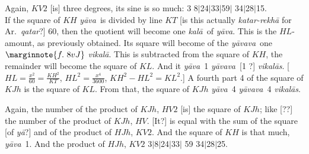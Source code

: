 \documentclass[11pt,a5paper]{book}
\def\kala{\textit{ka\-l\=a}}
\def\ya{\textit{y\=a}}
\def\yava{\textit{y\=ava}}
\def\yavava{\textit{y\=avava}}
\def\vikala{\textit{vi\-ka\-l\=a}}
\def\vikalas{\textit{vi\-ka\-l\=as}}
\def\danda{$|$}
\begin{document}
{Again, $KV2$ [is] three degrees, its sine is so much: 3 8\danda 24\danda 33\danda 59\danda
34\danda 28\danda 15. \\ 

\iffalse 
\begin{center}
\texttt{[image: 8r.png]}
\captionof{figure}{8r}
\end{center}
\fi 

If the square of $KH$ \yava\ is divided by line $KT$ [is this actually 
\textit{katar-rekh\=a} for Ar.\ \textit{qa\*tar}?] 60, then the quotient  will become
one \kala\ of \yava.   This is the $HL$-amount, as previously obtained. Its square
will become of the \yavava\ one
$\marginnote{f.~8v J}$
\vikala. This is subtracted from the square of $KH$, the remainder will become the
square of $KL$.  And it \yava\ 1  \yavava\ [1 ?] \vikalas. 
[$HL = \frac{x^2}{60} = \frac{KH^2}{KT}$, $HL^2 = \frac{x^4}{3600}$,
$KH^2 - HL^2 = KL^2$.]
A fourth part 4 of the square of $KJh$  is the square of $KL$. From that, 
the square of $KJh$ \yava\ 4 \yavava\ 4 \vikalas. 

Again, the number of the product of $KJh$, $HV2$ [is] the square of $KJh$; like [??]
the number of the product of $KJh$, $HV$. [It?] is equal with the sum of the square [of
\ya?] and of the
product of $HJh$, $KV2$. And the square of $KH$ is that much, \yava\ 1. And the
product of $HJh$, $KV2$ 3\danda 8\danda 24\danda 33\danda
59 34\danda 28\danda 25. 


}
\end{document}
